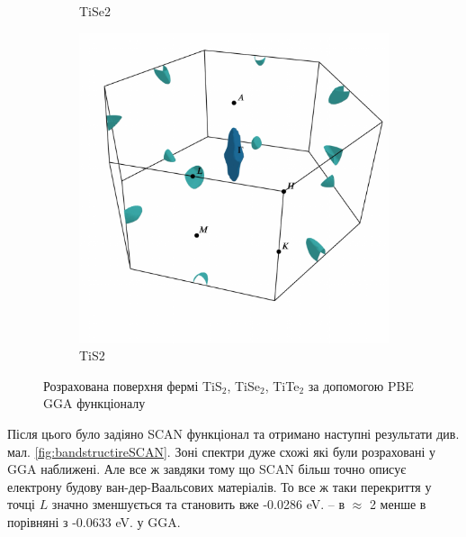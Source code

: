 \begin{figure}[H]
\begin{subfigure}[b]{.4\textwidth}
    	\caption{
    	TiSe2}
	\end{subfigure}
	\begin{subfigure}[b]{.9\textwidth}
    	\includegraphics[width=\linewidth]{img/results/fstis2.pdf}
    	\caption{
    	TiS2}
	\end{subfigure}
\caption{Розрахована поверхня фермі TiS$_2$, TiSe$_2$, TiTe$_2$ за допомогою PBE GGA функціоналу}
\label{fig:fermisurf}
\end{figure}

Після цього було задіяно SCAN функціонал та отримано наступні результати див. мал. \ref{fig:bandstructireSCAN}. Зоні спектри дуже схожі які були розраховані у GGA наближені. Але все ж завдяки тому що SCAN більш точно описує електрону будову ван-дер-Ваальсових матеріалів. То все ж таки перекриття у точці $L$ значно зменшується та становить вже -0.0286 eV. -- в $\approx$ 2 менше в порівняні з -0.0633 eV. у GGA. 

